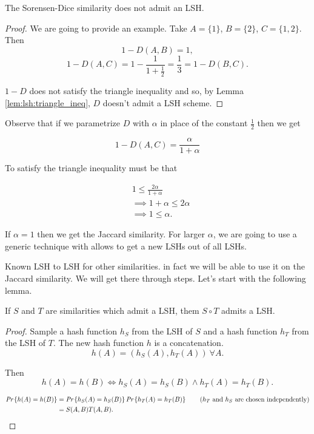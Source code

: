 \begin{claim}
	 The Sorensen-Dice similarity does not admit an LSH.
\end{claim}
\begin{proof}
We are going to provide an example. Take $A = \{1\}$, $B = \{2\}$, $C = \{1, 2\}$. Then
$$1 - D(A, B) = 1,$$ 
$$1 - D(A, C) = 1 - \frac{1}{1 + \frac{1}{2}} = \frac{1}{3} = 1 - D(B, C).$$

$1 - D$ does not satisfy the triangle inequality and so, by Lemma \ref{lem:lsh:triangle_ineq}, $D$ doesn't admit a LSH scheme. 
\end{proof}

Observe that if we parametrize $D$ with $\alpha$ in place of the constant $\frac{1}{2}$ then we get

$$1 - D(A, C) = \frac{\alpha}{1 + \alpha}$$

To satisfy the triangle inequality must be that

\begin{align*}
	&1 \leq \frac{2\alpha}{1 + \alpha}\\
	&\implies 1 + \alpha \leq 2\alpha\\
	&\implies 1 \leq \alpha.
\end{align*}

If $\alpha = 1$ then we get the Jaccard similarity. For larger $\alpha$, we are going to use a generic technique with allows to get a new LSHs out of all LSHs.

Known LSH to LSH for other similarities. in fact we will be able to use it on the Jaccard similarity. We will get there through steps. Let's start with the following lemma.

\begin{lem}\label{lem:lsh:comp}
	If $S$ and $T$ are similarities which admit a LSH, them $S\circ T$ admits a LSH.
\end{lem}
\begin{proof}
	Sample a hash function $h_S$ from the LSH of $S$ and a hash function $h_T$ from the LSH of $T$. The new hash function $h$ is a concatenation.
	\begin{equation}
		h(A) = (h_S(A), h_T(A))\ \forall A.
	\end{equation}
	
	Then 
	\begin{equation}
		h(A) = h(B) \Longleftrightarrow h_S(A) = h_S(B) \wedge h_T(A) = h_T(B).
	\end{equation}
	
	\begin{align}
	\emph{Pr}\left\{h(A) = h(B)\right\} &= \emph{Pr}\left\{h_S(A) = h_S(B)\right\} \emph{Pr}\left\{h_T(A) = h_T(B)\right\} \tag{$h_T$ and $h_S$ are chosen independently}\\
	 &= S(A, B) T(A, B).
	\end{align}
\end{proof}

